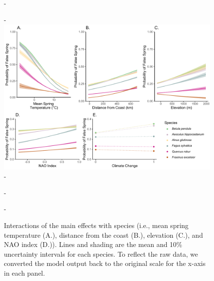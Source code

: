 \documentclass{article}\usepackage[]{graphicx}\usepackage[]{color}
\begin{document}
{\begin{figure} [H]
  -\begin{center}
  -\includegraphics[width=16cm]{..//analyses/figures/InteractionPlots/Species_orig.pdf}
  -\caption{Interactions of the main effects with species (i.e., mean spring temperature (A.), distance from the coast (B.), elevation (C.), and NAO index (D.)). Lines and shading are the mean and 10\% uncertainty intervals for each species. To reflect the raw data, we converted the model output back to the original scale for the x-axis in each panel. }\label{fig:spp}
  -\end{center}
  -\end{figure}}


  
\end{document}
